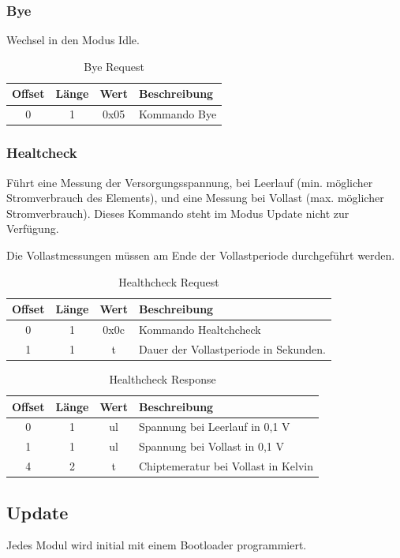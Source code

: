 \documentclass[10pt,a4paper]{article}
\begin{document}
\subsubsection{Bye}
\label{sec:Bye}
Wechsel in den Modus Idle.
\begin{table}[H]
\centering
\begin{tabular}{c|c|c|l}
\textbf{Offset} & \textbf{Länge} & \textbf{Wert} & \textbf{Beschreibung} \\ \hline
0 & 1 & 0x05 & Kommando Bye
\end{tabular}
\caption{Bye Request}
\end{table}

\subsubsection{Healtcheck}
\label{sec:Healthcheck}
Führt eine Messung der Versorgungsspannung, bei Leerlauf (min. möglicher Stromverbrauch des Elements), und eine Messung bei Vollast (max. möglicher Stromverbrauch). Dieses Kommando steht im Modus Update nicht zur Verfügung.

Die Vollastmessungen müssen am Ende der Vollastperiode durchgeführt werden.
\begin{table}[H]
\centering
\begin{tabular}{c|c|c|l}
\textbf{Offset} & \textbf{Länge} & \textbf{Wert} & \textbf{Beschreibung} \\ \hline
0 & 1 & 0x0c & Kommando Healtchcheck \\
1 & 1 & t & Dauer der Vollastperiode in Sekunden.
\end{tabular}
\caption{Healthcheck Request}
\end{table}
\begin{table}[H]
\centering
\begin{tabular}{c|c|c|l}
\textbf{Offset} & \textbf{Länge} & \textbf{Wert} & \textbf{Beschreibung} \\ \hline
0 & 1 & ul & Spannung bei Leerlauf in 0,1 V\\
1 & 1 & ul & Spannung bei Vollast in 0,1 V\\
4 & 2 & t & Chiptemeratur bei Vollast in Kelvin
\end{tabular}
\caption{Healthcheck Response}
\end{table}


\subsection{Update}
Jedes Modul wird initial mit einem Bootloader programmiert.
\end{document}
